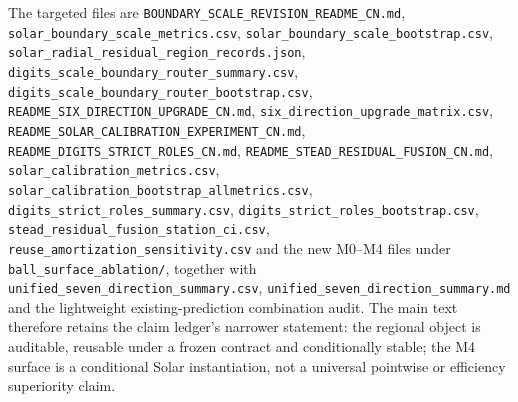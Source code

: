 \documentclass[11pt,a4paper]{article}
\numberwithin{equation}{section}
\theoremstyle{definition}\newtheorem{definition}[theorem]{Definition}
\theoremstyle{remark}\newtheorem{remark}[theorem]{Remark}
\begin{document}
The targeted files are \texttt{BOUNDARY\_SCALE\_REVISION\_README\_CN.md}, \texttt{solar\_boundary\_scale\_metrics.csv}, \texttt{solar\_boundary\_scale\_bootstrap.csv}, \texttt{solar\_radial\_residual\_region\_records.json}, \texttt{digits\_scale\_boundary\_router\_summary.csv}, \texttt{digits\_scale\_boundary\_router\_bootstrap.csv}, \texttt{README\_SIX\_DIRECTION\_UPGRADE\_CN.md}, \texttt{six\_direction\_upgrade\_matrix.csv}, \texttt{README\_SOLAR\_CALIBRATION\_EXPERIMENT\_CN.md}, \texttt{README\_DIGITS\_STRICT\_ROLES\_CN.md}, \texttt{README\_STEAD\_RESIDUAL\_FUSION\_CN.md}, \texttt{solar\_calibration\_metrics.csv}, \texttt{solar\_calibration\_bootstrap\_allmetrics.csv}, \texttt{digits\_strict\_roles\_summary.csv}, \texttt{digits\_strict\_roles\_bootstrap.csv}, \texttt{stead\_residual\_fusion\_station\_ci.csv}, \texttt{reuse\_amortization\_sensitivity.csv} and the new M0--M4 files under \texttt{ball\_surface\_ablation/}, together with \texttt{unified\_seven\_direction\_summary.csv}, \texttt{unified\_seven\_direction\_summary.md} and the lightweight existing-prediction combination audit. The main text therefore retains the claim ledger's narrower statement: the regional object is auditable, reusable under a frozen contract and conditionally stable; the M4 surface is a conditional Solar instantiation, not a universal pointwise or efficiency superiority claim.
\end{document}
